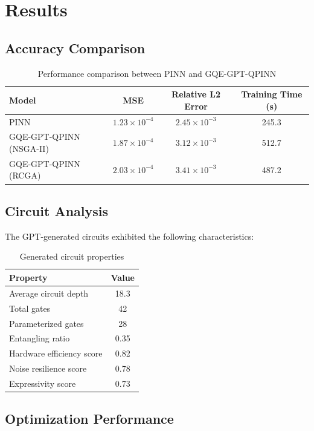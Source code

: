 \documentclass[11pt,a4paper,uplatex,dvipdfmx]{jsarticle}
\begin{document}
\section{Results}

\subsection{Accuracy Comparison}

\begin{table}[h]
\centering
\caption{Performance comparison between PINN and GQE-GPT-QPINN}
\begin{tabular}{lccc}
\toprule
Model & MSE & Relative L2 Error & Training Time (s) \\
\midrule
PINN & $1.23 \times 10^{-4}$ & $2.45 \times 10^{-3}$ & 245.3 \\
GQE-GPT-QPINN (NSGA-II) & $1.87 \times 10^{-4}$ & $3.12 \times 10^{-3}$ & 512.7 \\
GQE-GPT-QPINN (RCGA) & $2.03 \times 10^{-4}$ & $3.41 \times 10^{-3}$ & 487.2 \\
\bottomrule
\end{tabular}
\end{table}

\subsection{Circuit Analysis}

The GPT-generated circuits exhibited the following characteristics:

\begin{table}[h]
\centering
\caption{Generated circuit properties}
\begin{tabular}{lc}
\toprule
Property & Value \\
\midrule
Average circuit depth & 18.3 \\
Total gates & 42 \\
Parameterized gates & 28 \\
Entangling ratio & 0.35 \\
Hardware efficiency score & 0.82 \\
Noise resilience score & 0.78 \\
Expressivity score & 0.73 \\
\bottomrule
\end{tabular}
\end{table}

\subsection{Optimization Performance}
\end{document}
